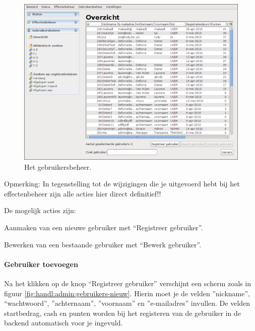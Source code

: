 \begin{figure}[h!]
	\centering
		\includegraphics[width=\textwidth]{images/handleiding/administratie/gebruikers-overzicht}
	\caption{Het gebruikersbeheer.}
		\label{fig:handl:admin:gebruikers-overzicht}
\end{figure}

Opmerking: In tegenstelling tot de wijzigingen die je uitgevoerd hebt bij het effectenbeheer zijn alle acties hier direct definitief!!

De mogelijk acties zijn:
\begin{itemize_compact}
\item{Aanmaken van een nieuwe gebruiker met ``Registreer gebruiker''.}
\item{Bewerken van een bestaande gebruiker met ``Bewerk gebruiker''.}
\end{itemize_compact}

\paragraph{Gebruiker toevoegen}

Na het klikken op de knop ``Registreer gebruiker'' verschijnt een scherm zoals in figuur \ref{fig:handl:admin:gebruikers-nieuw}. Hierin moet je de velden ''nickname'', ``wachtwoord'', ''achternaam'', ''voornaam'' en ''e-mailadres'' invullen. 
De velden startbedrag, cash en punten worden bij het registeren van de gebruiker in de backend automatisch voor je ingevuld.

